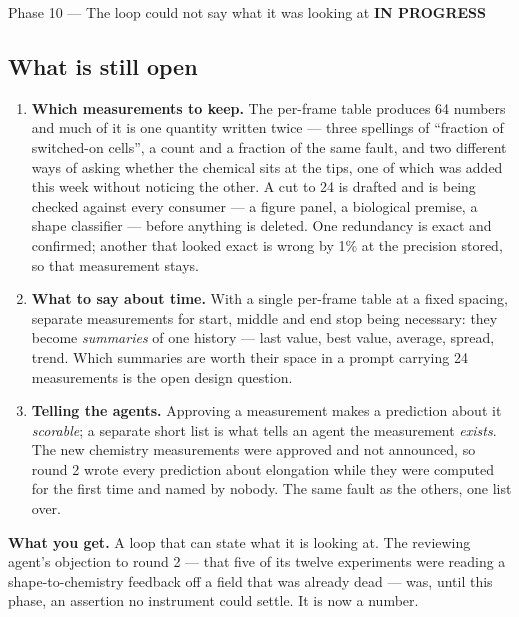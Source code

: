 \documentclass[11pt,a4paper]{article}
\newcommand{\prog}{\textcolor{warn}{\textbf{IN PROGRESS}}}
\begin{document}
\begin{phasebox}{Phase 10 --- The loop could not say what it was looking at \hfill \prog}
\subsection*{What is still open}
\begin{enumerate}\itemsep2pt
\item \textbf{Which measurements to keep.} The per-frame table produces 64 numbers and much of it
      is one quantity written twice --- three spellings of ``fraction of switched-on cells'', a
      count and a fraction of the same fault, and two different ways of asking whether the
      chemical sits at the tips, one of which was added this week without noticing the other. A
      cut to 24 is drafted and is being checked against every consumer --- a figure panel, a
      biological premise, a shape classifier --- before anything is deleted. One redundancy is
      exact and confirmed; another that looked exact is wrong by 1\% at the precision stored, so
      that measurement stays.
\item \textbf{What to say about time.} With a single per-frame table at a fixed spacing, separate
      measurements for start, middle and end stop being necessary: they become \emph{summaries}
      of one history --- last value, best value, average, spread, trend. Which summaries are
      worth their space in a prompt carrying 24 measurements is the open design question.
\item \textbf{Telling the agents.} Approving a measurement makes a prediction about it
      \emph{scorable}; a separate short list is what tells an agent the measurement \emph{exists}.
      The new chemistry measurements were approved and not announced, so round 2 wrote every
      prediction about elongation while they were computed for the first time and named by
      nobody. The same fault as the others, one list over.
\end{enumerate}

\textbf{What you get.} A loop that can state what it is looking at. The reviewing agent's
objection to round 2 --- that five of its twelve experiments were reading a shape-to-chemistry
feedback off a field that was already dead --- was, until this phase, an assertion no instrument
could settle. It is now a number.
\end{phasebox}
\end{document}
